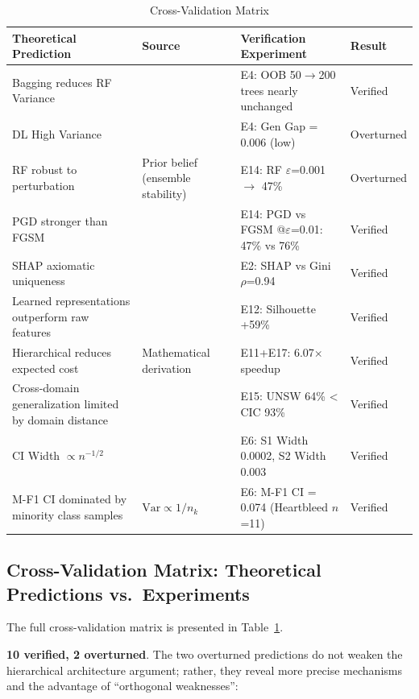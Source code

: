 \documentclass[sigconf]{acmart}
\begin{document}
\begin{table}[!t]
\caption{Cross-Validation Matrix}
\label{tab:cross_validation}
\begin{tabular}{p{5.0cm}p{2.2cm}p{5.4cm}p{2.2cm}}
\toprule
\textbf{Theoretical Prediction} & \textbf{Source} & \textbf{Verification Experiment} & \textbf{Result} \\
\midrule
Bagging reduces RF Variance & \cite{3} & E4: OOB 50$\to$200 trees nearly unchanged & Verified \\
DL High Variance & \cite{5} & E4: Gen Gap = 0.006 (low) & Overturned \\
RF robust to perturbation & Prior belief (ensemble stability) & E14: RF $\varepsilon$=0.001 $\to$ 47\% & Overturned \\
PGD stronger than FGSM & \cite{13} & E14: PGD vs FGSM @$\varepsilon$=0.01: 47\% vs 76\% & Verified \\
SHAP axiomatic uniqueness & \cite{12} & E2: SHAP vs Gini $\rho$=0.94 & Verified \\
Learned representations outperform raw features & \cite{5} & E12: Silhouette +59\% & Verified \\
Hierarchical reduces expected cost & Mathematical derivation & E11+E17: 6.07$\times$ speedup & Verified \\
Cross-domain generalization limited by domain distance & \cite{2} & E15: UNSW 64\% < CIC 93\% & Verified \\
CI Width $\propto n^{-1/2}$ & \cite{6} & E6: S1 Width 0.0002, S2 Width 0.003 & Verified \\
M-F1 CI dominated by minority class samples & $\text{Var} \propto 1/n_k$ & E6: M-F1 CI = 0.074 (Heartbleed $n$=11) & Verified \\
\bottomrule
\end{tabular}
\end{table}

\subsection{Cross-Validation Matrix: Theoretical Predictions vs.\ Experiments} The full cross-validation matrix is presented in Table~\ref{tab:cross_validation}.

\textbf{10 verified, 2 overturned}. The two overturned predictions do not weaken the hierarchical architecture argument; rather, they reveal more precise mechanisms and the advantage of ``orthogonal weaknesses'':
\end{document}
